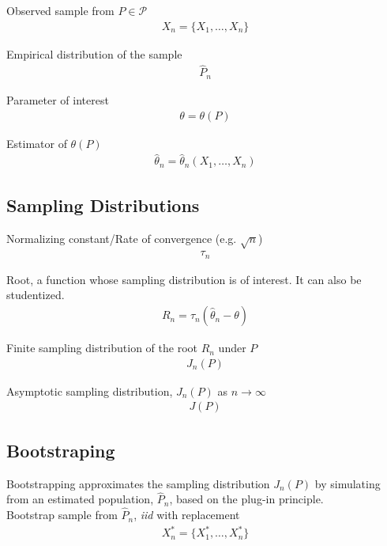 \documentclass[9pt]{article}
\begin{document}
Observed sample from $P\in\mathcal{P}$
\begin{align}
    X_n = \{X_1, \dots, X_n\}
\end{align}

Empirical distribution of the sample
\begin{align}
    \hat{P}_n
\end{align}

Parameter of interest
\begin{align}
    \theta = \theta(P)
\end{align}

Estimator of $\theta(P)$
\begin{align}
    \hat{\theta}_n = \hat{\theta}_n(X_1, \dots, X_n)
\end{align}

\subsection*{Sampling Distributions}

Normalizing constant/Rate of convergence (e.g. $\sqrt{n}$)
\begin{align}
    \tau_n
\end{align}

Root, a function whose sampling distribution is of interest. It can also be studentized.
\begin{align}
    R_n = \tau_n(\hat\theta_n - \theta)
\end{align}

Finite sampling distribution of the root $R_n$ under $P$
\begin{align}
    J_n(P)
\end{align}

Asymptotic sampling distribution, $J_n(P)$ as $n\to\infty$
\begin{align}
    J(P)
\end{align}


\subsection*{Bootstraping}
Bootstrapping approximates the sampling distribution $J_n(P)$ by simulating from an estimated population, $\hat{P}_n$, based on the plug-in principle.\\

Bootstrap sample from $\hat{P}_n$, \textit{iid} with replacement
\begin{align}
    X^*_n = \{X^*_1,\dots,X^*_n\}
\end{align}
\end{document}
